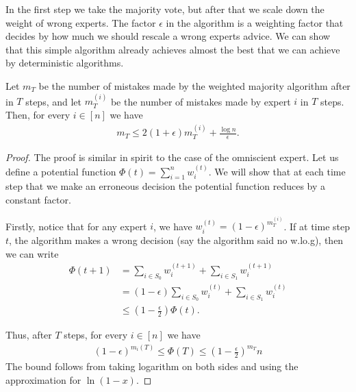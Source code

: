In the first step we take the majority vote, but after that we scale down the weight of wrong experts. The factor $\epsilon$ in the algorithm is a weighting factor that decides by how much we should rescale a wrong experts advice. We can show that this simple algorithm already achieves almost the best that we can achieve by deterministic algorithms.

\begin{theorem}
	Let $m_T$ be the number of mistakes made by the weighted majority algorithm after in $T$ steps, and let $m^{(i)}_T$ be the number of mistakes made by expert $i$ in $T$ steps. Then, for every $i \in [n]$ we have
	\begin{align*}
		m_T \leq 2(1+\epsilon)m^{(i)}_T + \frac{\log n}{\epsilon}.
	\end{align*}
	\label{thm:wgtd-maj}
\end{theorem}
\begin{proof}
	The proof is similar in spirit to the case of the omniscient expert. Let us define a potential function $\Phi(t) = \sum_{i=1}^n w_i^{(t)}$. We will show that at each time step that we make an erroneous decision the potential function reduces by a constant factor.
	
	Firstly, notice that for any expert $i$, we have $w_i^{(t)} = (1-\epsilon)^{m_T^{(i)}}$. If at time step $t$, the algorithm makes a wrong decision (say the algorithm said no w.lo.g), then we can write
	\begin{align*}
		\Phi(t+1) &= \sum_{i\in S_0} w_i^{(t+1)} + \sum_{i\in S_1} w_i^{(t+1)}\\
		&= (1-\epsilon)\sum_{i\in S_0} w_i^{(t)} + \sum_{i\in S_1} w_i^{(t)}\\
		&\leq \left( 1 - \frac{\epsilon}{2}\right)\Phi(t).
	\end{align*}

	Thus, after $T$ steps, for every $i\in [n]$ we have
	\begin{align*}
		(1-\epsilon)^{m_i{(T)}} \leq \Phi(T) \leq \left(1 - \frac{\epsilon}{2} \right)^{m_T}n
	\end{align*}
	The bound follows from taking logarithm on both sides and using the approximation for $\ln(1-x)$.
\end{proof}
